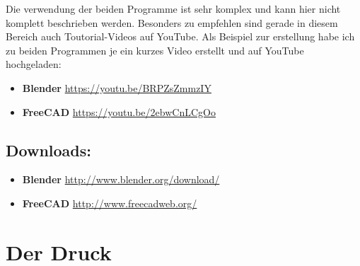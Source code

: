 \documentclass[11pt,a4paper]{scrartcl}
\begin{document}
Die verwendung der beiden Programme ist sehr komplex und kann hier nicht komplett beschrieben werden. Besonders zu empfehlen sind gerade in diesem Bereich auch Toutorial-Videos auf YouTube. Als Beispiel zur erstellung habe ich zu beiden Programmen je ein kurzes Video erstellt und auf YouTube hochgeladen:
\begin{itemize}
  \item \textbf{Blender} \url{https://youtu.be/BRPZsZmmzIY}
  \item \textbf{FreeCAD} \url{https://youtu.be/2ebwCnLCgOo}
\end{itemize}

\subsection*{Downloads:}
\begin{itemize}
  \item \textbf{Blender} \url{http://www.blender.org/download/}
  \item \textbf{FreeCAD} \url{http://www.freecadweb.org/}
\end{itemize}
\pagebreak
\section{Der Druck}
\end{document}
